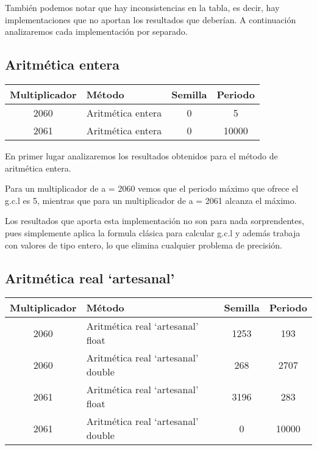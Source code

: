 También podemos notar que hay inconsistencias en la tabla, es decir, hay implementaciones que no aportan los resultados que deberían. A continuación analizaremos cada implementación por separado.


\subsection{Aritmética entera}
\begin{table}[H]
\centering
\begin{tabular}{|c|l|c|c|}
\hline
\textbf{Multiplicador} & \textbf{Método} & \textbf{Semilla} & \textbf{Periodo} \\ \hline
2060 & Aritmética entera & 0 & 5 \\
2061 & Aritmética entera & 0 & 10000 \\ \hline
\end{tabular}
\end{table}

En primer lugar analizaremos los resultados obtenidos para el método de aritmética entera.

Para un multiplicador de a = 2060 vemos que el periodo máximo que ofrece el g.c.l es 5, mientras que para un multiplicador de a = 2061 alcanza el máximo.

Los resultados que aporta esta implementación no son para nada sorprendentes, pues simplemente aplica la formula clásica para calcular g.c.l y además trabaja con valores de tipo entero, lo que elimina cualquier problema de precisión.

\subsection{Aritmética real `artesanal'}
\begin{table}[H]
\centering
\begin{tabular}{|c|l|c|c|}
\hline
\textbf{Multiplicador} & \textbf{Método} & \textbf{Semilla} & \textbf{Periodo} \\ \hline
2060 & Aritmética real `artesanal' float & 1253 & 193 \\
2060 & Aritmética real `artesanal' double & 268 & 2707 \\
2061 & Aritmética real `artesanal' float & 3196 & 283 \\
2061 & Aritmética real `artesanal' double & 0 & 10000 \\ \hline
\end{tabular}
\end{table}

